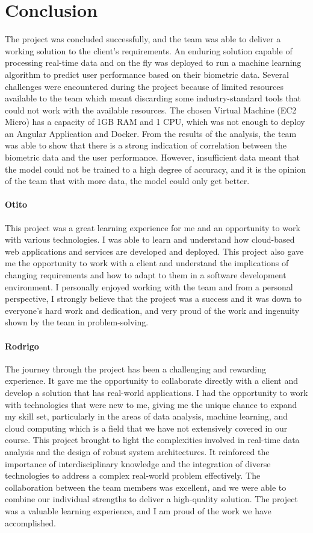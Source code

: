 \chapter{Conclusion}

The project was concluded successfully, and the team was able to deliver a working solution to the client's requirements. An enduring
solution capable of processing real-time data and on the fly was deployed to run a machine learning algorithm to predict user performance
based on their biometric data. Several challenges were encountered during the project because of limited resources available to the team
which meant discarding some industry-standard tools that could not work with the available resources. The chosen Virtual Machine (EC2 Micro)
has a capacity of 1GB RAM and 1 CPU, which was not enough to deploy an Angular Application and Docker. From the results of the analysis, the team
was able to show that there is a strong indication of correlation between the biometric data and the user performance. However, insufficient data
meant that the model could not be trained to a high degree of accuracy, and it is the opinion of the team that with more data, the model could only 
get better.


\subsubsection*{Otito}
This project was a great learning experience for me and an opportunity to work with various technologies. I was able to learn and understand how 
cloud-based web applications and services are developed and deployed. This project also gave me the opportunity to work with a client and understand 
the implications of changing requirements and how to adapt to them in a software development environment. I personally enjoyed working with the team and 
from a personal perspective, I strongly believe that the project was a success and it was down to everyone's hard work and dedication, and very proud of 
the work and ingenuity shown by the team in problem-solving. 

\subsubsection*{Rodrigo}

The journey through the project has been a challenging and rewarding experience. It gave me the opportunity to collaborate directly with a client and develop 
a solution that has real-world applications. I had the opportunity to work with technologies that were new to me, giving me the unique chance to expand my skill 
set, particularly in the areas of data analysis, machine learning, and cloud computing which is a field that we have not extensively covered in our course.  
This project brought to light the complexities involved in real-time data analysis and the design of robust system architectures. It reinforced the
importance of interdisciplinary knowledge and the integration of diverse technologies to address a complex real-world problem effectively. 
The collaboration between the team members was excellent, and we were able to combine our individual strengths to deliver a high-quality solution. 
The project was a valuable learning experience, and I am proud of the work we have accomplished.

